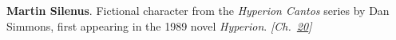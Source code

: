 \textbf{Martin Silenus}. Fictional character from the \emph{Hyperion Cantos} series by Dan Simmons, first appearing in the 1989 novel \emph{Hyperion}. \emph{[Ch.~\hyperref[ch:chineseroomargument]{20}]}

